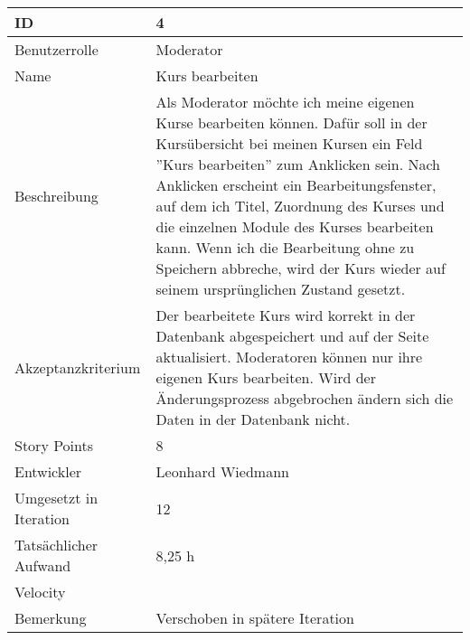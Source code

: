 \begin{tabularx}{\textwidth}{|p{}|X|}
	\hline
	ID & 4\\
	\hline
	Benutzerrolle & Moderator\\
	\hline
	Name & Kurs bearbeiten\\
	\hline
	Beschreibung & Als Moderator möchte ich meine eigenen Kurse bearbeiten können. Dafür soll in der Kursübersicht bei meinen Kursen ein Feld ''Kurs bearbeiten'' zum Anklicken sein. Nach Anklicken erscheint ein Bearbeitungsfenster, auf dem ich Titel, Zuordnung des Kurses und die einzelnen Module des Kurses bearbeiten kann. Wenn ich die Bearbeitung ohne zu Speichern abbreche, wird der Kurs wieder auf seinem ursprünglichen Zustand gesetzt.\\
	\hline
	Akzeptanzkriterium & Der bearbeitete Kurs wird korrekt in der Datenbank abgespeichert und auf der Seite aktualisiert. Moderatoren können nur ihre eigenen Kurs bearbeiten. Wird der Änderungsprozess abgebrochen ändern sich die Daten in der Datenbank nicht.\\
	\hline
	Story Points & 8 \\
	\hline
	Entwickler & Leonhard Wiedmann \\
	\hline
	Umgesetzt in Iteration & 12\\
	\hline
	Tatsächlicher Aufwand & 8,25 h \\
	\hline
	Velocity & \\
	\hline
	Bemerkung & Verschoben in spätere Iteration\\
	\hline
\end{tabularx}
\vspace{20pt}
